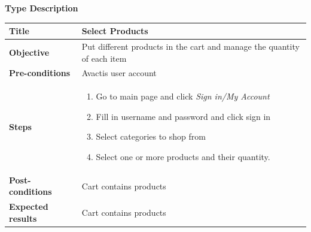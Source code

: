 \documentclass[UKenglish,12pt]{article}
\begin{document}
\begin{enumerate}
\textbf{\hspace{0.3cm}Type\hspace{4.4cm} Description}
\newline \vspace{0.2cm}
\begin{tabular}{| p{5cm} | p{10cm} | }
	\hline
	 \textbf{Title} & Select Products \\ \hline
	 \textbf{Objective} & Put different products in the cart and manage the quantity of each item \\ \hline
	 \textbf{Pre-conditions} & Avactis user account \\ \hline
	 \textbf{Steps} & \begin{enumerate} \item Go to main page and click \textit{Sign in/My Account} \item Fill in username and password and click sign in \item Select categories to shop from \item Select one or more products and their quantity.
	 \end{enumerate} \\ \hline
	 \textbf{Post-conditions} & Cart contains products \\ \hline
	 \textbf{Expected results} & Cart contains products \\ 
	 \hline
\end{tabular} %



\end{enumerate}
\end{document}
